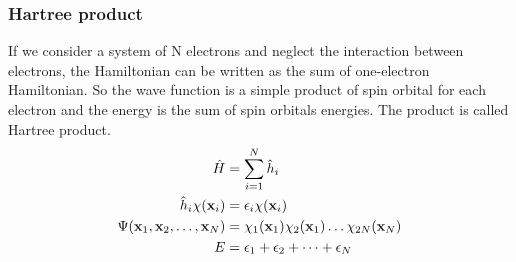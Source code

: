 \documentclass[11pt]{article}
\begin{document}
\subsubsection{Hartree product}
If we consider a system of N electrons and neglect the interaction between electrons, the Hamiltonian can be written as the sum
of one-electron Hamiltonian. So the wave function is a simple product of spin orbital for each electron and the energy is the sum
of spin orbitals energies. The product is called Hartree product.
\begin{align}
    \Hat{H}&=\sum_{i=1}^{N}\Hat{h}_i\\
    \Hat{h}_i\chi(\mathbf{x}_i)&=\epsilon_i\chi(\mathbf{x}_i)\\
    \Psi(\mathbf{x}_1,\mathbf{x}_2,\ldots,\mathbf{x}_N)&=\chi_1(\mathbf{x}_1)\chi_2(\mathbf{x}_1)\ldots\chi_{2N}(\mathbf{x}_N)\\
    E&=\epsilon_1+\epsilon_2+\cdots+\epsilon_N
\end{align}
\end{document}
